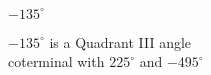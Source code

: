 {$-135^{\circ}$}
{$-135^{\circ}$ is a Quadrant III angle\\
coterminal with $225^{\circ}$ and $-495^{\circ}$

\begin{center}
\end{center}}
